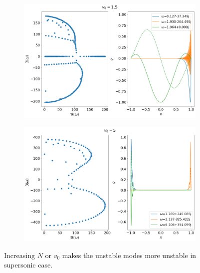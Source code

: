 \documentclass{article}
\begin{document}
\begin{figure}[H]
    \centering
    \begin{subfigure}[b]{0.45\linewidth}
        \includegraphics[width=\linewidth]{img/results-fd-N=201,v0=1.5.png}
        \caption{}
    \end{subfigure}%
    \begin{subfigure}[b]{0.45\linewidth}
        \includegraphics[width=\linewidth]{img/results-fd-N=101,v0=5.png}
        \caption{}
    \end{subfigure}
    \caption{Increasing $N$ or $v_0$ makes the unstable modes more unstable in supersonic case.}
    \label{fig:results-fd-unstable}
\end{figure}
\end{document}
